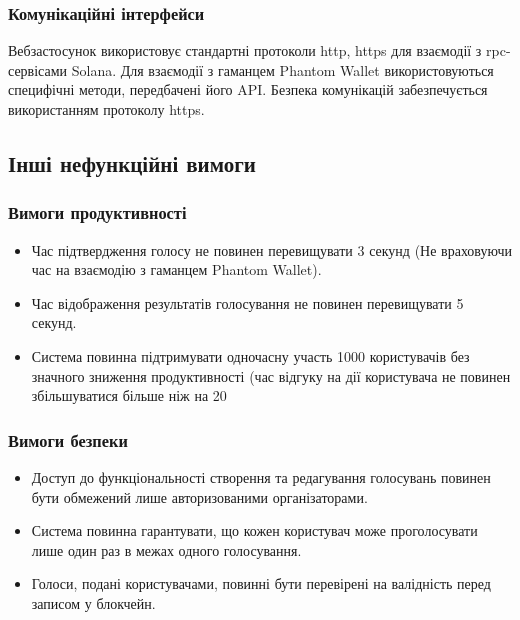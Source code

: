 \documentclass[14pt]{extreport}
\begin{document}
  \subsubsection{Комунікаційні інтерфейси}
  Вебзастосунок використовує стандартні протоколи \gls{http}, \gls{https} для взаємодії з \gls{rpc}-сервісами Solana. Для взаємодії з гаманцем Phantom Wallet використовуються специфічні методи, передбачені його API. Безпека комунікацій забезпечується використанням протоколу \gls{https}.
  
  \subsection{Інші нефункційні вимоги}
  \subsubsection{Вимоги продуктивності}
  \begin{itemize}
    \item Час підтвердження голосу не повинен перевищувати 3 секунд (Не враховуючи час на взаємодію з гаманцем Phantom Wallet).
    \item Час відображення результатів голосування не повинен перевищувати 5 секунд.  
    \item Система повинна підтримувати одночасну участь 1000 користувачів без значного зниження продуктивності (час відгуку на дії користувача не повинен збільшуватися більше ніж на 20%
  \end{itemize}

  \subsubsection{Вимоги безпеки}
  \begin{itemize}
    \item Доступ до функціональності створення та редагування голосувань повинен бути обмежений лише авторизованими організаторами.
    \item Система повинна гарантувати, що кожен користувач може проголосувати лише один раз в межах одного голосування.
    \item Голоси, подані користувачами, повинні бути перевірені на валідність перед записом у блокчейн.
  \end{itemize}
  
\end{document}
